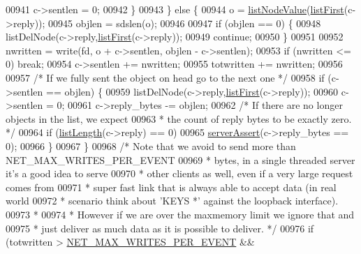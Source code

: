 \begin{DoxyCode}
{{{{{{{{{{00941                 c->sentlen = 0;
00942             \}
00943         \} \textcolor{keywordflow}{else} \{
00944             o = \hyperlink{adlist_8h_af84cae230e7180ebcda1e2736fce9f65}{listNodeValue}(\hyperlink{adlist_8h_aa8dc514bbe217bb2e87c1c77cfa84690}{listFirst}(c->reply));
00945             objlen = sdslen(o);
00946 
00947             \textcolor{keywordflow}{if} (objlen == 0) \{
00948                 listDelNode(c->reply,\hyperlink{adlist_8h_aa8dc514bbe217bb2e87c1c77cfa84690}{listFirst}(c->reply));
00949                 \textcolor{keywordflow}{continue};
00950             \}
00951 
00952             nwritten = write(fd, o + c->sentlen, objlen - c->sentlen);
00953             \textcolor{keywordflow}{if} (nwritten <= 0) \textcolor{keywordflow}{break};
00954             c->sentlen += nwritten;
00955             totwritten += nwritten;
00956 
00957             \textcolor{comment}{/* If we fully sent the object on head go to the next one */}
00958             \textcolor{keywordflow}{if} (c->sentlen == objlen) \{
00959                 listDelNode(c->reply,\hyperlink{adlist_8h_aa8dc514bbe217bb2e87c1c77cfa84690}{listFirst}(c->reply));
00960                 c->sentlen = 0;
00961                 c->reply\_bytes -= objlen;
00962                 \textcolor{comment}{/* If there are no longer objects in the list, we expect}
00963 \textcolor{comment}{                 * the count of reply bytes to be exactly zero. */}
00964                 \textcolor{keywordflow}{if} (\hyperlink{adlist_8h_afde0ab079f934670e82119b43120e94b}{listLength}(c->reply) == 0)
00965                     \hyperlink{server_8h_a88114b5169b4c382df6b56506285e56a}{serverAssert}(c->reply\_bytes == 0);
00966             \}
00967         \}
00968         \textcolor{comment}{/* Note that we avoid to send more than NET\_MAX\_WRITES\_PER\_EVENT}
00969 \textcolor{comment}{         * bytes, in a single threaded server it's a good idea to serve}
00970 \textcolor{comment}{         * other clients as well, even if a very large request comes from}
00971 \textcolor{comment}{         * super fast link that is always able to accept data (in real world}
00972 \textcolor{comment}{         * scenario think about 'KEYS *' against the loopback interface).}
00973 \textcolor{comment}{         *}
00974 \textcolor{comment}{         * However if we are over the maxmemory limit we ignore that and}
00975 \textcolor{comment}{         * just deliver as much data as it is possible to deliver. */}
00976         \textcolor{keywordflow}{if} (totwritten > \hyperlink{server_8h_abbdb0d4ea3a77e70614d6b0cd0311c61}{NET\_MAX\_WRITES\_PER\_EVENT} &&
}}}}}}}}}}
\end{DoxyCode}
